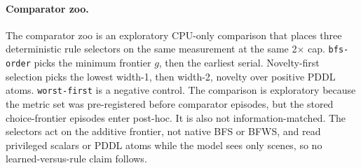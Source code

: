 \paragraph{Comparator zoo.}
\label{sec:results-calibration}
The comparator zoo is an exploratory CPU-only comparison that places three deterministic rule selectors on the same measurement at the same 2$\times$ cap. \texttt{bfs-order} picks the minimum frontier $g$, then the earliest serial. Novelty-first selection picks the lowest width-1, then width-2, novelty over positive PDDL atoms. \texttt{worst-first} is a negative control. The comparison is exploratory because the metric set was pre-registered before comparator episodes, but the stored choice-frontier episodes enter post-hoc. It is also not information-matched. The selectors act on the additive frontier, not native BFS or BFWS, and read privileged scalars or PDDL atoms while the model sees only scenes, so no learned-versus-rule claim follows.

